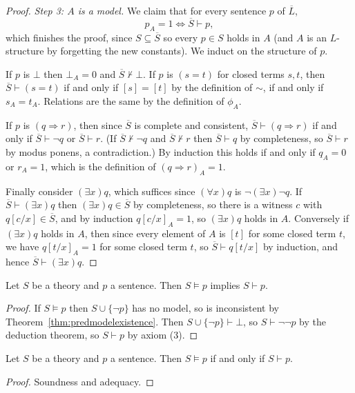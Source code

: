 \begin{proof}
  \emph{Step 3: $A$ is a model.} We claim that for every sentence $p$ of $\overline L$,
  $$p_A = 1 \iff \overline S \vdash p,$$
  which finishes the proof, since $S \subseteq \overline S$ so every $p \in S$ holds in $A$ (and $A$ is an $L$-structure by forgetting the new constants). We induct on the structure of $p$.

  If $p$ is $\bot$ then $\bot_A = 0$ and $\overline S \not\vdash \bot$. If $p$ is $(s = t)$ for closed terms $s, t$, then $\overline S \vdash (s=t)$ if and only if $[s] = [t]$ by the definition of $\sim$, if and only if $s_A = t_A$. Relations are the same by the definition of $\phi_A$.

  If $p$ is $(q \Rightarrow r)$, then since $\overline{S}$ is complete and consistent, $\overline S \vdash (q \Rightarrow r)$ if and only if $\overline S \vdash \lnot q$ or $\overline S \vdash r$. (If $\overline S \not\vdash \lnot q$ and $\overline S \not\vdash r$ then $\overline S \vdash q$ by completeness, so $\overline S \vdash r$ by modus ponens, a contradiction.) By induction this holds if and only if $q_A = 0$ or $r_A = 1$, which is the definition of $(q \Rightarrow r)_A = 1$.

  Finally consider $(\exists x)q$, which suffices since $(\forall x) q$ is $\lnot(\exists x)\lnot q$. If $\overline S \vdash (\exists x)q$ then $(\exists x) q \in \overline S$ by completeness, so there is a witness $c$ with $q[c/x] \in \overline S$, and by induction $q[c/x]_A = 1$, so $(\exists x)q$ holds in $A$. Conversely if $(\exists x) q$ holds in $A$, then since every element of $A$ is $[t]$ for some closed term $t$, we have $q[t/x]_A = 1$ for some closed term $t$, so $\overline S \vdash q[t/x]$ by induction, and hence $\overline S \vdash (\exists x)q$.
\end{proof}

\begin{corollary}[Adequacy]
  Let $S$ be a theory and $p$ a sentence. Then $S \models p$ implies $S \vdash p$.
\end{corollary}
\begin{proof}
  If $S \models p$ then $S \cup \{\lnot p\}$ has no model, so is inconsistent by Theorem~\ref{thm:predmodelexistence}. Then $S \cup \{\lnot p\} \vdash \bot$, so $S \vdash \lnot \lnot p$ by the deduction theorem, so $S \vdash p$ by axiom (3).
\end{proof}

\begin{theorem}
  Let $S$ be a theory and $p$ a sentence. Then $S \models p$ if and only if $S \vdash p$.
\end{theorem}
\begin{proof}
  Soundness and adequacy.
\end{proof}

